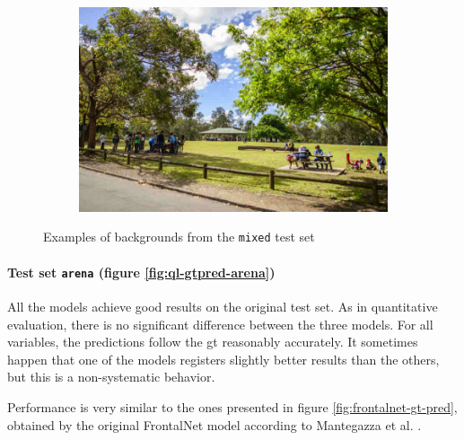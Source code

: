 \begin{figure}[!h]
\begin{center}
\begin{subfigure}[h]{0.24\textwidth}
		\end{subfigure}
		\hfill
		\begin{subfigure}[h]{0.24\textwidth}
			\centering
			\includegraphics[width=1\textwidth]{"contents/images/06-img-park"}
		\end{subfigure}
	\end{center}
	\vspace{-0.5cm}
	\caption[Examples of backgrounds from the \texttt{mixed} test set]{Examples of backgrounds from the \texttt{mixed} test set}
	\label{fig:ql-mixedset}
\end{figure}

\paragraph*{Test set \texttt{arena} (figure \ref{fig:ql-gtpred-arena})}

All the models achieve good results on the original test set. As in quantitative evaluation, there is no significant difference between the three models. For all variables, the predictions follow the \gls{gt} reasonably accurately. It sometimes happen that one of the models registers slightly better results than the others, but this is a non-systematic behavior.

Performance is very similar to the ones presented in figure \ref{fig:frontalnet-gt-pred}, obtained by the original FrontalNet model according to Mantegazza et al. \cite{mantegazza2019visionbased}.

